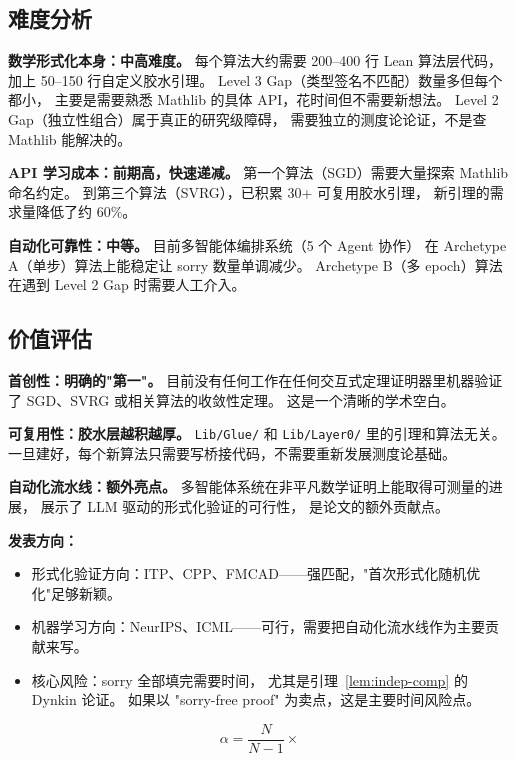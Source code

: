 \documentclass[11pt]{article}
\theoremstyle{remark}
\begin{document}
\subsection{难度分析}

\textbf{数学形式化本身：中高难度。}
每个算法大约需要 200--400 行 Lean 算法层代码，
加上 50--150 行自定义胶水引理。
Level 3 Gap（类型签名不匹配）数量多但每个都小，
主要是需要熟悉 Mathlib 的具体 API，花时间但不需要新想法。
Level 2 Gap（独立性组合）属于真正的研究级障碍，
需要独立的测度论论证，不是查 Mathlib 能解决的。

\textbf{API 学习成本：前期高，快速递减。}
第一个算法（SGD）需要大量探索 Mathlib 命名约定。
到第三个算法（SVRG），已积累 30+ 可复用胶水引理，
新引理的需求量降低了约 60\%。

\textbf{自动化可靠性：中等。}
目前多智能体编排系统（5 个 Agent 协作）
在 Archetype A（单步）算法上能稳定让 sorry 数量单调减少。
Archetype B（多 epoch）算法在遇到 Level 2 Gap 时需要人工介入。

\subsection{价值评估}

\textbf{首创性：明确的"第一"。}
目前没有任何工作在任何交互式定理证明器里机器验证了
SGD、SVRG 或相关算法的收敛性定理。
这是一个清晰的学术空白。

\textbf{可复用性：胶水层越积越厚。}
\texttt{Lib/Glue/} 和 \texttt{Lib/Layer0/} 里的引理和算法无关。
一旦建好，每个新算法只需要写桥接代码，不需要重新发展测度论基础。

\textbf{自动化流水线：额外亮点。}
多智能体系统在非平凡数学证明上能取得可测量的进展，
展示了 LLM 驱动的形式化验证的可行性，
是论文的额外贡献点。

\textbf{发表方向：}
\begin{itemize}
  \item 形式化验证方向：ITP、CPP、FMCAD——强匹配，"首次形式化随机优化"足够新颖。
  \item 机器学习方向：NeurIPS、ICML——可行，需要把自动化流水线作为主要贡献来写。
  \item 核心风险：sorry 全部填完需要时间，
    尤其是引理~\ref{lem:indep-comp} 的 Dynkin 论证。
    如果以 "sorry-free proof" 为卖点，这是主要时间风险点。
\end{itemize}

$$\alpha = \frac{N}{N-1} \times  $$
\end{document}
